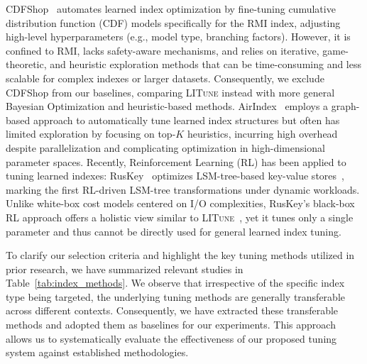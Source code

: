 {\color{black}
CDFShop~\cite{marcus2020cdfshop} automates learned index optimization by fine-tuning cumulative distribution function (CDF) models specifically for the RMI index, adjusting high-level hyperparameters (e.g., model type, branching factors). However, it is confined to RMI, lacks safety-aware mechanisms, and relies on iterative, game-theoretic, and heuristic exploration methods that can be time-consuming and less scalable for complex indexes or larger datasets. Consequently, we exclude CDFShop from our baselines, comparing \textsc{LITune} instead with more general Bayesian Optimization and heuristic-based methods. AirIndex~\cite{chockchowwat2023airindex} employs a graph-based approach to automatically tune learned index structures but often has limited exploration by focusing on top-$K$ heuristics, incurring high overhead despite parallelization and complicating optimization in high-dimensional parameter spaces. Recently, Reinforcement Learning (RL) has been applied to tuning learned indexes: RusKey~\cite{mo2023learning} optimizes LSM-tree-based key-value stores~\cite{sutton2018reinforcement}, marking the first RL-driven LSM-tree transformations under dynamic workloads. Unlike white-box cost models centered on I/O complexities, RusKey’s black-box RL approach offers a holistic view similar to \textsc{LITune}~\cite{dayan2018dostoevsky}, yet it tunes only a single parameter and thus cannot be directly used for general learned index tuning. 
}



To clarify our selection criteria and highlight the key tuning methods utilized in prior research, we have summarized relevant studies in Table~\ref{tab:index_methods}. We observe that irrespective of the specific index type being targeted, the underlying tuning methods are generally transferable across different contexts. Consequently, we have extracted these transferable methods and adopted them as baselines for our experiments. This approach allows us to systematically evaluate the effectiveness of our proposed tuning system against established methodologies.


